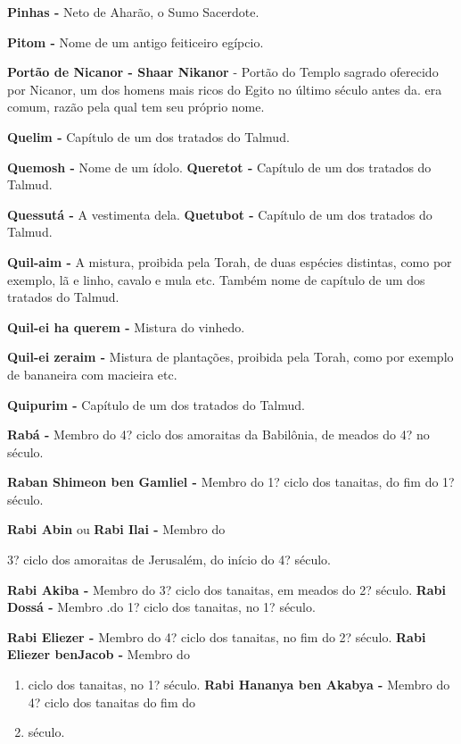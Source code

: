 \textbf{Pinhas -} Neto de Aharão, o Sumo Sa­cerdote.

\textbf{Pitom -} Nome de um antigo feiticeiro egípcio.

\textbf{Portão de Nicanor - Shaar Nikanor} - Portão do Templo sagrado
oferecido por Nicanor, um dos homens mais ri­cos do Egito no último
século antes da. era comum, razão pela qual tem seu próprio nome.

\textbf{Quelim -} Capítulo de um dos tratados do Talmud.

\textbf{Quemosh -} Nome de um ídolo. \textbf{Queretot -} Capítulo de um
dos trata­dos do Talmud.

\textbf{Quessutá -} A vestimenta dela. \textbf{Quetubot -} Capítulo de
um dos trata­dos do Talmud.

\textbf{Quil-aim -} A mistura, proibida pela Torah, de duas espécies
distintas, co­mo por exemplo, lã e linho, cavalo e mula etc. Também nome
de capítulo de um dos tratados do Talmud.

\textbf{Quil-ei ha querem -} Mistura do vinhedo.

\textbf{Quil-ei zeraim -} Mistura de planta­ções, proibida pela Torah,
como por exemplo de bananeira com macieira etc.

\textbf{Quipurim -} Capítulo de um dos trata­dos do Talmud.

\textbf{Rabá -} Membro do 4? ciclo dos amo­raitas da Babilônia, de
meados do 4? no século.

\textbf{Raban Shimeon ben Gamliel -} Mem­bro do 1? ciclo dos tanaitas,
do fim do 1? século.

\textbf{Rabi Abin} ou \textbf{Rabi Ilai -} Membro do

3? ciclo dos amoraitas de Jerusalém, do início do 4? século.

\textbf{Rabi Akiba -} Membro do 3? ciclo dos tanaitas, em meados do 2?
século. \textbf{Rabi Dossá -} Membro .do 1? ciclo dos tanaitas, no 1?
século.

\textbf{Rabi Eliezer -} Membro do 4? ciclo dos tanaitas, no fim do 2?
século. \textbf{Rabi Eliezer benJacob -} Membro do

\begin{enumerate}
\def\labelenumi{\arabic{enumi}.}
\item
  ciclo dos tanaitas, no 1? século. \textbf{Rabi Hananya ben Akabya -}
  Mem­bro do 4? ciclo dos tanaitas do fim do
\item
  século.
\end{enumerate}

